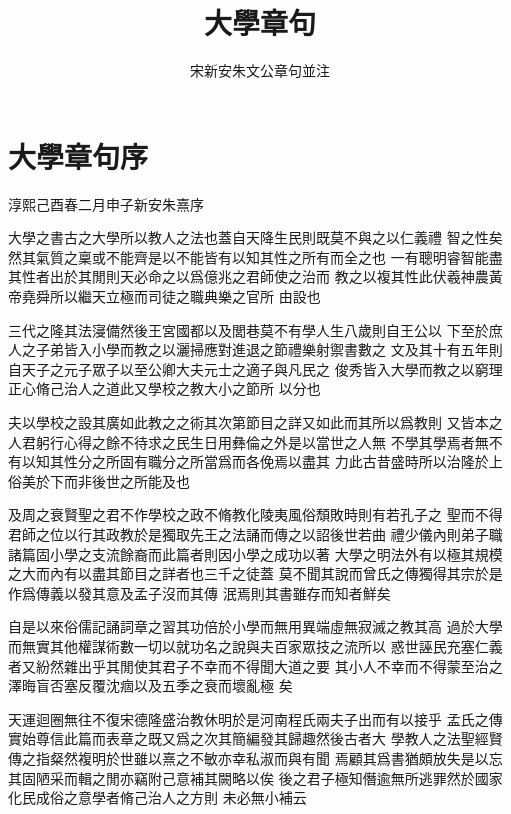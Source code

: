 \documentclass{zhvt-classic}
\title{大學章句}[大~學~章~句]
\author{宋新安朱文公章句並注}
\begin{document}
\maketitle

\clearpage

\gridall
\tableofcontents

\chapter[序]{大學章句序}

\hfill 淳熙己酉春二月申子新安朱熹序

大學之書古之大學所以教人之法也蓋自天降生民則既莫不與之以仁義禮
智之性矣然其氣質之稟或不能齊是以不能皆有以知其性之所有而全之也
一有聰明睿智能盡其性者出於其閒則天必命之以爲億兆之君師使之治而
教之以複其性此伏羲神農黃帝堯舜所以繼天立極而司徒之職典樂之官所
由設也

三代之隆其法寖備然後王宮國都以及閭巷莫不有學人生八歲則自王公以
下至於庶人之子弟皆入小學而教之以灑掃應對進退之節禮樂射禦書數之
文及其十有五年則自天子之元子眾子以至公卿大夫元士之適子與凡民之
俊秀皆入大學而教之以窮理正心脩己治人之道此又學校之教大小之節所
以分也

夫以學校之設其廣如此教之之術其次第節目之詳又如此而其所以爲教則
又皆本之人君躬行心得之餘不待求之民生日用彝倫之外是以當世之人無
不學其學焉者無不有以知其性分之所固有職分之所當爲而各俛焉以盡其
力此古昔盛時所以治隆於上俗美於下而非後世之所能及也

及周之衰賢聖之君不作學校之政不脩教化陵夷風俗頹敗時則有若孔子之
聖而不得君師之位以行其政教於是獨取先王之法誦而傳之以詔後世若曲
禮少儀內則弟子職諸篇固小學之支流餘裔而此篇者則因小學之成功以著
大學之明法外有以極其規模之大而內有以盡其節目之詳者也三千之徒蓋
莫不聞其說而曾氏之傳獨得其宗於是作爲傳義以發其意及孟子沒而其傳
泯焉則其書雖存而知者鮮矣

自是以來俗儒記誦詞章之習其功倍於小學而無用異端虛無寂滅之教其高
過於大學而無實其他權謀術數一切以就功名之說與夫百家眾技之流所以
惑世誣民充塞仁義者又紛然雜出乎其閒使其君子不幸而不得聞大道之要
其小人不幸而不得蒙至治之澤晦盲否塞反覆沈痼以及五季之衰而壞亂極
矣

天運迴圈無往不復宋德隆盛治教休明於是河南程氏兩夫子出而有以接乎
孟氏之傳實始尊信此篇而表章之既又爲之次其簡編發其歸趣然後古者大
學教人之法聖經賢傳之指粲然複明於世雖以熹之不敏亦幸私淑而與有聞
焉顧其爲書猶頗放失是以忘其固陋采而輯之閒亦竊附己意補其闕略以俟
後之君子極知僭逾無所逃罪然於國家化民成俗之意學者脩己治人之方則
未必無小補云
\end{document}
